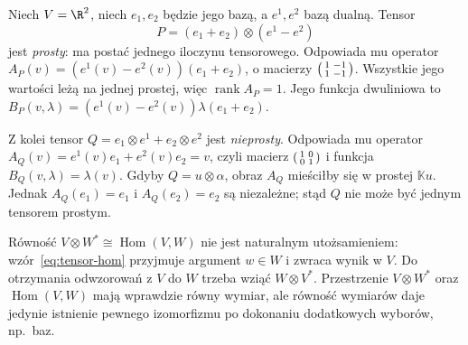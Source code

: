 \begin{przyklad}
Niech $V=\R^2$, niech $e_1,e_2$ będzie jego bazą, a
$e^1,e^2$ bazą dualną. Tensor
\[
 P=(e_1+e_2)\otimes(e^1-e^2)
\]
jest \emph{prosty}: ma postać jednego iloczynu tensorowego.
Odpowiada mu operator $A_P(v)=(e^1(v)-e^2(v))(e_1+e_2)$,
o macierzy
$\begin{psmallmatrix}1&-1\\1&-1\end{psmallmatrix}$.
Wszystkie jego wartości leżą na jednej prostej, więc
$\operatorname{rank}A_P=1$. Jego funkcja dwuliniowa to
$B_P(v,\lambda)=(e^1(v)-e^2(v))\lambda(e_1+e_2)$.

Z kolei tensor
$Q=e_1\otimes e^1+e_2\otimes e^2$ jest
\emph{nieprosty}. Odpowiada mu operator
$A_Q(v)=e^1(v)e_1+e^2(v)e_2=v$, czyli macierz
$\begin{psmallmatrix}1&0\\0&1\end{psmallmatrix}$ i funkcja
$B_Q(v,\lambda)=\lambda(v)$. Gdyby $Q=u\otimes\alpha$,
obraz $A_Q$ mieściłby się w prostej $\mathbb Ku$.
Jednak $A_Q(e_1)=e_1$ i $A_Q(e_2)=e_2$ są niezależne;
stąd $Q$ nie może być jednym tensorem prostym.
\end{przyklad}

\begin{uwaga}
Równość $V\otimes W^*\cong\operatorname{Hom}(V,W)$
nie jest naturalnym utożsamieniem: wzór~\eqref{eq:tensor-hom}
przyjmuje argument $w\in W$ i zwraca wynik w $V$.
Do otrzymania odwzorowań z $V$ do $W$ trzeba wziąć
$W\otimes V^*$. Przestrzenie $V\otimes W^*$ oraz
$\operatorname{Hom}(V,W)$ mają wprawdzie równy wymiar,
ale równość wymiarów daje jedynie istnienie pewnego
izomorfizmu po dokonaniu dodatkowych wyborów, np.\ baz.
\end{uwaga}

